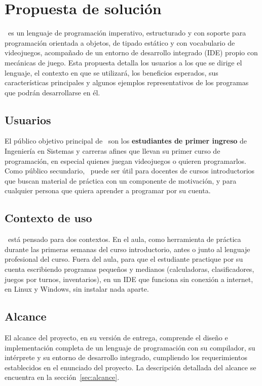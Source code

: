 \newpage
\section{Propuesta de solución}

\ggez\ es un lenguaje de programación imperativo, estructurado y con soporte para programación orientada a objetos, de tipado estático y con vocabulario de videojuegos, acompañado de un entorno de desarrollo integrado (IDE) propio con mecánicas de juego. Esta propuesta detalla los usuarios a los que se dirige el lenguaje, el contexto en que se utilizará, los beneficios esperados, sus características principales y algunos ejemplos representativos de los programas que podrán desarrollarse en él.

\subsection{Usuarios}

El público objetivo principal de \ggez\ son los \textbf{estudiantes de primer ingreso} de Ingeniería en Sistemas y carreras afines que llevan su primer curso de programación, en especial quienes juegan videojuegos o quieren programarlos. Como público secundario, \ggez\ puede ser útil para docentes de cursos introductorios que buscan material de práctica con un componente de motivación, y para cualquier persona que quiera aprender a programar por su cuenta.

\subsection{Contexto de uso}

\ggez\ está pensado para dos contextos. En el aula, como herramienta de práctica durante las primeras semanas del curso introductorio, antes o junto al lenguaje profesional del curso. Fuera del aula, para que el estudiante practique por su cuenta escribiendo programas pequeños y medianos (calculadoras, clasificadores, juegos por turnos, inventarios), en un IDE que funciona sin conexión a internet, en Linux y Windows, sin instalar nada aparte.

\subsection{Alcance}

El alcance del proyecto, en su versión de entrega, comprende el diseño e implementación completa de un lenguaje de programación con su compilador, su intérprete y su entorno de desarrollo integrado, cumpliendo los requerimientos establecidos en el enunciado del proyecto. La descripción detallada del alcance se encuentra en la sección~\ref{sec:alcance}.

